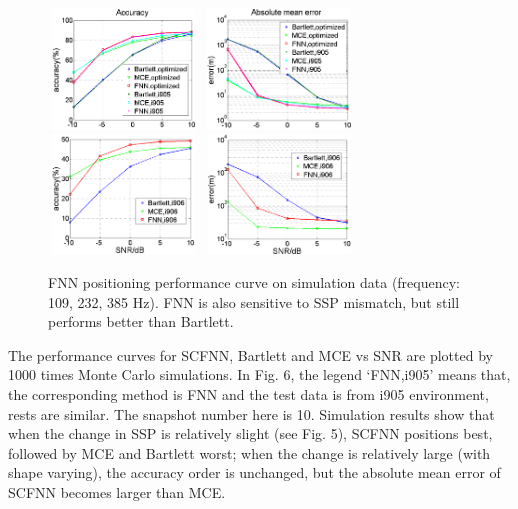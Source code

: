 \begin{figure}
\includegraphics[width=4cm,height=3.2cm]{figure/Accuracy_to_SNR_FNN_vs_Bartlett_MCE}
\includegraphics[width=4cm,height=3.2cm]{figure/Error_to_SNR_FNN_vs_Bartlett_MCE}
\includegraphics[width=4cm,height=3.2cm]{figure/Accuracy_to_SNR_FNN_vs_Bartlett_MCE_i906}
\includegraphics[width=4cm,height=3.2cm]{figure/Error_to_SNR_FNN_vs_Bartlett_MCE_i906}
\caption{FNN positioning performance curve on simulation data (frequency: 109, 232, 385 Hz).
 FNN is also sensitive to SSP mismatch, but still performs better than Bartlett.
}
\end{figure}
The performance curves for SCFNN, Bartlett and MCE vs SNR are plotted by 1000 times Monte Carlo simulations. In Fig. 6, the legend `FNN,i905' means that, the corresponding method is FNN and the test data is from i905 environment, rests are similar. The snapshot number here is 10.
Simulation results show that when the change in SSP is relatively slight (see Fig. 5), SCFNN positions best, followed by MCE and Bartlett worst; when the change is relatively large (with shape varying), the accuracy order is unchanged, but the absolute mean error of SCFNN becomes larger than MCE.
